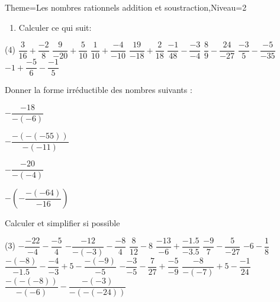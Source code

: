 \documentclass[a4paper,12pt]{article}
\begin{document}
\begin{Maquette}[Fiche]{Theme=Les nombres rationnels addition et soustraction,Niveau=2}

\begin{exercice}
\begin{enumerate}
\item Calculer ce qui suit:
\end{enumerate}
\begin{tasks}(4)
\task $\dfrac{3}{16}+\dfrac{-2}{8}$
\task $\dfrac{9}{-20}+\dfrac{5}{10}$
\task $\dfrac{1}{10}+\dfrac{-4}{-10}$
\task $\dfrac{19}{-18}+\dfrac{2}{18} $
\task $\dfrac{-1}{48}-\dfrac{-3}{-4}$
\task $\dfrac{8}{9}-\dfrac{24}{-27}$
\task $\dfrac{-3}{5}-\dfrac{-5}{-35} $
\task $-1+\dfrac{-5}{6}-\dfrac{-1}{5}$
\end{tasks}
\end{exercice}

\begin{exercice}
Donner la forme irréductible des nombres suivants :\newline
\begin{itemize*}
\item $-\dfrac{-18}{-(-6)}$
\item $ -\dfrac{-(-(-55))}{-(-11)}$
\item $-\dfrac{-20}{-(-4)}$
\item $ -\left(-\dfrac{-(-64)}{-16} \right)$
\end{itemize*}
\end{exercice}

\begin{exercice}
Calculer et simplifier si possible
\begin{tasks}(3)
\task $-\dfrac{-22}{-4}-\dfrac{-5}{4}$
\task $-\dfrac{-12}{-(-3)}-\dfrac{-8}{4}$
\task $\dfrac{8}{12}-8 $
\task $\dfrac{-13}{-6}+\dfrac{-1.5}{-3.5}$
\task $\dfrac{-9}{7}-\dfrac{5}{-27}$
\task $-6-\dfrac{1}{8} $
\task $ \dfrac{-(-8)}{-1.5}-\dfrac{-4}{-3}+5-\dfrac{-(-9)}{-5}$
\task $-\dfrac{-3}{-5}-\dfrac{7}{27}+\dfrac{-5}{-9}$
\task $ \dfrac{-8}{-(-7)}+5-\dfrac{-1}{24}$
\task $\dfrac{-(-(-8))}{-(-6)}-\dfrac{-(-3)}{-(-(-24))} $
\end{tasks}
\end{exercice}


\end{Maquette}
\end{document}
